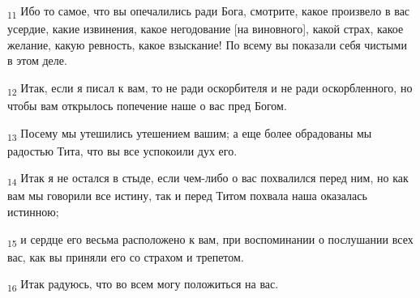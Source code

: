 \begin{tcolorbox}
\textsubscript{11} Ибо то самое, что вы опечалились ради Бога, смотрите, какое произвело в вас усердие, какие извинения, какое негодование [на виновного], какой страх, какое желание, какую ревность, какое взыскание! По всему вы показали себя чистыми в этом деле.
\end{tcolorbox}
\begin{tcolorbox}
\textsubscript{12} Итак, если я писал к вам, то не ради оскорбителя и не ради оскорбленного, но чтобы вам открылось попечение наше о вас пред Богом.
\end{tcolorbox}
\begin{tcolorbox}
\textsubscript{13} Посему мы утешились утешением вашим; а еще более обрадованы мы радостью Тита, что вы все успокоили дух его.
\end{tcolorbox}
\begin{tcolorbox}
\textsubscript{14} Итак я не остался в стыде, если чем-либо о вас похвалился перед ним, но как вам мы говорили все истину, так и перед Титом похвала наша оказалась истинною;
\end{tcolorbox}
\begin{tcolorbox}
\textsubscript{15} и сердце его весьма расположено к вам, при воспоминании о послушании всех вас, как вы приняли его со страхом и трепетом.
\end{tcolorbox}
\begin{tcolorbox}
\textsubscript{16} Итак радуюсь, что во всем могу положиться на вас.
\end{tcolorbox}
